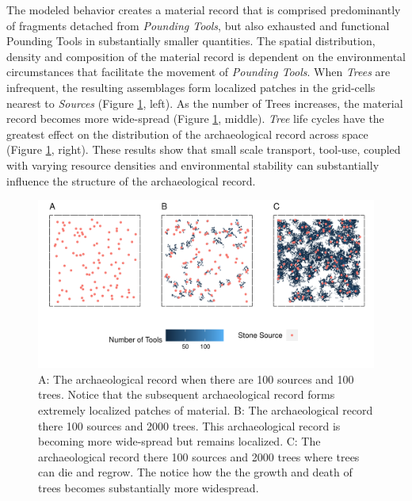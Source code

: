 \documentclass[9pt,twocolumn,twoside,]{pnas-new}
\begin{document}
The modeled behavior creates a material record that is comprised
predominantly of fragments detached from \emph{Pounding Tools}, but also
exhausted and functional Pounding Tools in substantially smaller
quantities. The spatial distribution, density and composition of the
material record is dependent on the environmental circumstances that
facilitate the movement of \emph{Pounding Tools}. When \emph{Trees} are
infrequent, the resulting assemblages form localized patches in the
grid-cells nearest to \emph{Sources} (Figure \ref{distribution}, left).
As the number of Trees increases, the material record becomes more
wide-spread (Figure \ref{distribution}, middle). \emph{Tree} life cycles
have the greatest effect on the distribution of the archaeological
record across space (Figure \ref{distribution}, right). These results
show that small scale transport, tool-use, coupled with varying resource
densities and environmental stability can substantially influence the
structure of the archaeological record.

\begin{figure}

\includegraphics[width=6.5in]{Reeves_et_al_2021_Panda_ABM_files/figure-latex/figure 3-1.pdf}

\caption{A: The archaeological record when there are 100 sources and 100 trees. Notice that the subsequent archaeological record forms extremely localized patches of material. B: The archaeological record there 100 sources and 2000 trees. This archaeological record is becoming more wide-spread but remains localized. C: The archaeological record there 100 sources and 2000 trees where trees can die and regrow. The notice how the the growth and death of trees becomes substantially more widespread.}

\label{distribution}

\end{figure}
\end{document}

